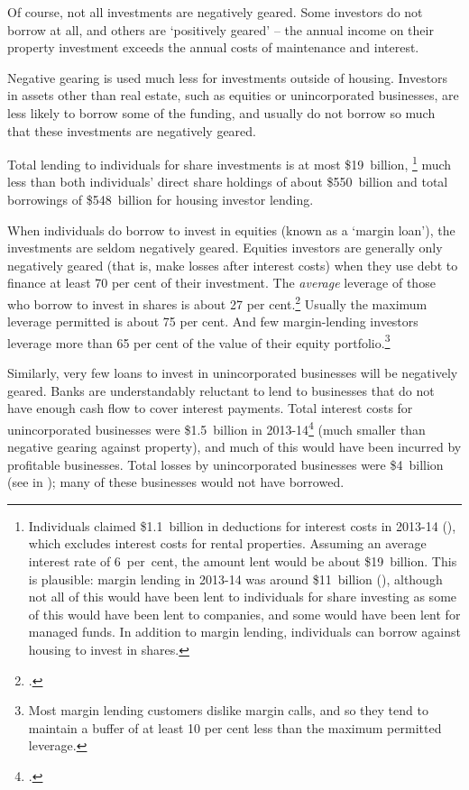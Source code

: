 Of course, not all investments are negatively geared. Some investors do not borrow at all, and others are ‘positively geared’ – the annual income on their property investment exceeds the annual costs of maintenance and interest. 
  
  Negative gearing is used much less for investments outside of housing. Investors in assets other than real estate, such as equities or unincorporated businesses, are less likely to borrow some of the funding, and usually do not borrow so much that these investments are negatively geared. 

Total lending to individuals for share investments is at most \$19~billion,%
\footnote{Individuals claimed \$1.1~billion in deductions for interest costs in 2013-14 (\textcite[][Table 12]{ATOTaxstats201314}), which excludes interest costs for rental properties. Assuming an average interest rate of 6~per~cent, the amount lent would be about \$19~billion. This is plausible: margin lending in 2013-14 was around \$11~billion (\textcite{RBA2015StatsMarginLending}), although not all of this would have been lent to individuals for share investing as some of this would have been lent to companies, and some would have been lent for managed funds. In addition to margin lending, individuals can borrow against housing to invest in shares.} %
much less than both individuals’ direct share holdings of about \$550~billion and total borrowings of \$548~billion for housing investor lending.  


When individuals do borrow to invest in equities (known as a ‘margin loan’), the investments are seldom negatively geared. Equities investors are generally only negatively geared (that is, make losses after interest costs) when they use debt to finance at least 70 per cent of their investment.  The \emph{average} leverage of those who borrow to invest in shares is about 27 per cent.\footcite[][Table~D2]{RBA2015StatsMarginLending} Usually the maximum leverage permitted is about 75 per cent. And few margin-lending investors leverage more than 65 per cent of the value of their equity portfolio.\footnote{Most margin lending customers dislike margin calls, and so they tend to maintain a buffer of at least 10 per cent less than the maximum permitted leverage.}

Similarly, very few loans to invest in unincorporated businesses will be negatively geared. Banks are understandably reluctant to lend to businesses that do not have enough cash flow to cover interest payments. Total interest costs for unincorporated businesses were \$1.5~billion in 2013-14\footcite{ATOTaxstats201314} (much smaller than negative gearing against property), and much of this would have been incurred by profitable businesses. Total losses by unincorporated businesses were \$4~billion (see  in ); many of these businesses would not have borrowed. 

